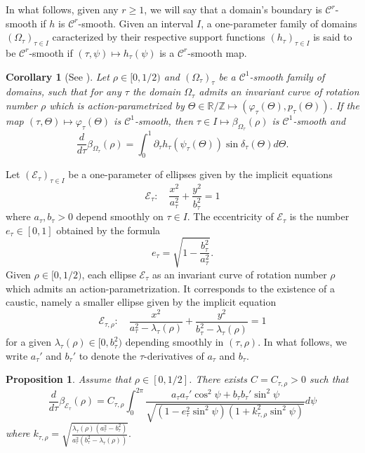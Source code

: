 \documentclass[a4paper]{article}
\newtheorem{proposition}{Proposition}
\newtheorem{corollary}{Corollary}
\theoremstyle{definition}
\def\R{\mathbb{R}}
\def\Z{\mathbb{Z}}
\begin{document}
In what follows, given any $r\geq 1$, we will say that a domain's boundary is $\mathscr C^r$-smooth if $h$ is $\mathscr C^r$-smooth. Given an interval $I$, a one-parameter family of domains $(\Omega_{\tau})_{\tau\in I}$ caracterized by their respective support functions $(h_{\tau})_{\tau\in I}$ is said to be $\mathscr C^r$-smooth if $(\tau,\psi)\mapsto h_{\tau}(\psi)$ is a $\mathscr C^r$-smooth map.

\begin{corollary}[See \cite{FKS_ellipse}]
\label{cor:first_var_beta}
Let $\rho\in[0,1/2)$ and $(\Omega_{\tau})_{\tau}$ be a $\mathscr C^1$-smooth family of domains, such that for any $\tau$ the domain $\Omega_{\tau}$ admits an invariant curve of rotation number $\rho$ which is action-parametrized by  $\Theta\in\R/\Z\mapsto (\varphi_{\tau}(\Theta),p_{\tau}(\Theta))$. If the map $(\tau,\Theta)\mapsto\varphi_{\tau}(\Theta)$ is $\mathscr C^1$-smooth, then $\tau\in I\mapsto\beta_{\Omega_{\tau}}(\rho)$ is $\mathscr C^1$-smooth and
\begin{equation}
\label{eq:first_var_beta}
\frac{d}{d\tau}\beta_{\Omega_{\tau}}(\rho) = \int_0^1\partial_{\tau}h_{\tau}(\psi_{\tau}(\Theta))\sin\delta_{\tau}(\Theta)d\Theta.
\end{equation}
\end{corollary}
\vspace{0.2cm}

Let $(\mathscr E_{\tau})_{\tau\in I}$ be a one-parameter of ellipses given by the implicit equations
\begin{equation}
\label{eq:ellipse}
\mathscr E_{\tau}:\quad 
\frac{x^2}{a_{\tau}^2}+\frac{y^2}{b_{\tau}^2}=1
\end{equation}
where $a_{\tau},b_{\tau}>0$ depend smoothly on $\tau\in I$. The eccentricity of $\mathscr E_{\tau}$ is the number $e_{\tau}\in[0,1]$ obtained by the formula
\[
e_{\tau} = \sqrt{1-\frac{b_{\tau}^2}{a_{\tau}^2}}.
\]
Given $\rho\in[0,1/2)$, each ellipse $\mathscr E_{\tau}$ as an invariant curve of rotation number $\rho$ which admits an action-parametrization. It corresponds to the existence of a caustic, namely a smaller ellipse given by the implicit equation
\[
\mathscr E_{\tau,\rho}:\quad 
\frac{x^2}{a_{\tau}^2-\lambda_{\tau}(\rho)}+\frac{y^2}{b_{\tau}^2-\lambda_{\tau}(\rho)}=1
\]
for a given $\lambda_{\tau}(\rho)\in [0,b_{\tau}^2)$ depending smoothly in $(\tau,\rho)$.
In what follows, we write $a_{\tau}'$ and $b_{\tau}'$ to denote the $\tau$-derivatives of $a_{\tau}$ and $b_{\tau}$.

\begin{proposition}
\label{prop:derivative_beta}
Assume that $\rho\in[0,1/2]$. There exists $C=C_{\tau,\rho}>0$ such that 
\[
\frac{d}{d\tau}\beta_{\mathscr E_{\tau}}(\rho) = 
C_{\tau,\rho} \int_0^{2\pi}\frac{a_{\tau}a_{\tau}'\cos^2\psi+b_{\tau}b_{\tau}'\sin^2\psi}{\sqrt{(1-e_{\tau}^2\sin^2\psi)(1+k_{\tau,\rho}^2\sin^2\psi)}}d\psi
\]
where $k_{\tau,\rho} = \sqrt{\frac{\lambda_{\tau}(\rho)(a_{\tau}^2-b_{\tau}^2)}{a_{\tau}^2(b_{\tau}^2-\lambda_{\tau}(\rho))}}.$
\end{proposition}
\end{document}
